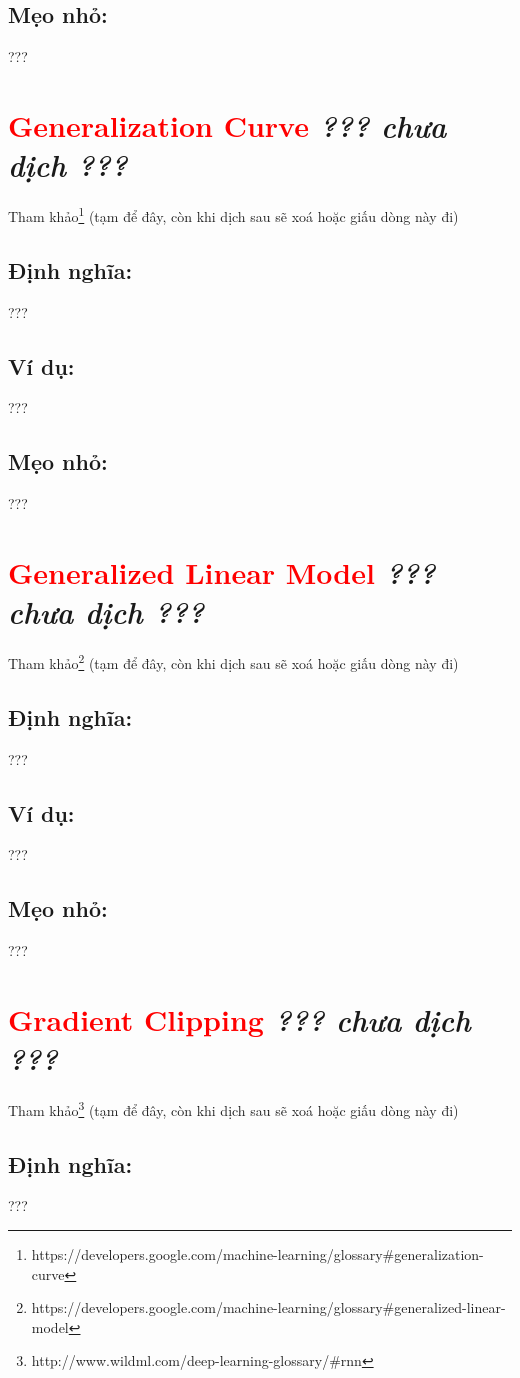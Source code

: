 \subsection*{Mẹo nhỏ:}
???
\section*{\huge \textcolor{Red}{Generalization Curve}  \small \textit{??? chưa dịch ???} }
Tham khảo\footnote{https://developers.google.com/machine-learning/glossary\#generalization-curve} (tạm để đây, còn khi dịch sau sẽ xoá hoặc giấu dòng này đi)
\subsection*{Định nghĩa:}
???
\subsection*{Ví dụ:}
???
\subsection*{Mẹo nhỏ:}
???
\section*{\huge \textcolor{Red}{Generalized Linear Model}  \small \textit{??? chưa dịch ???} }
Tham khảo\footnote{https://developers.google.com/machine-learning/glossary\#generalized-linear-model} (tạm để đây, còn khi dịch sau sẽ xoá hoặc giấu dòng này đi)
\subsection*{Định nghĩa:}
???
\subsection*{Ví dụ:}
???
\subsection*{Mẹo nhỏ:}
???
\section*{\huge \textcolor{Red}{Gradient Clipping}  \small \textit{??? chưa dịch ???} }
Tham khảo\footnote{http://www.wildml.com/deep-learning-glossary/\#rnn} (tạm để đây, còn khi dịch sau sẽ xoá hoặc giấu dòng này đi)
\subsection*{Định nghĩa:}
???
